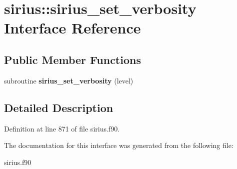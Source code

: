 \hypertarget{interfacesirius_1_1sirius__set__verbosity}{}\section{sirius\+:\+:sirius\+\_\+set\+\_\+verbosity Interface Reference}
\label{interfacesirius_1_1sirius__set__verbosity}
\subsection*{Public Member Functions}
\begin{DoxyCompactItemize}
\item 
\hypertarget{interfacesirius_1_1sirius__set__verbosity_adaec69f92ac6bc9d24365dae9840abaf}{}subroutine {\bfseries sirius\+\_\+set\+\_\+verbosity} (level)\label{interfacesirius_1_1sirius__set__verbosity_adaec69f92ac6bc9d24365dae9840abaf}

\end{DoxyCompactItemize}


\subsection{Detailed Description}


Definition at line 871 of file sirius.\+f90.



The documentation for this interface was generated from the following file\+:\begin{DoxyCompactItemize}
\item 
sirius.\+f90\end{DoxyCompactItemize}
